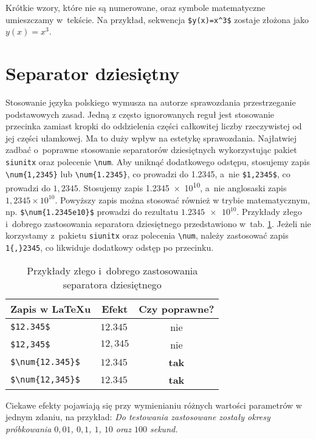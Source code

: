 Krótkie wzory, które nie są numerowane, oraz symbole matematyczne umieszczamy w~tekście. Na przykład, sekwencja \verb|$y(x)=x^3$| zostaje złożona jako $y(x)=x^3$.

\section{Separator dziesiętny}
Stosowanie języka polskiego wymusza na autorze sprawozdania przestrzeganie podstawowych zasad. Jedną z często ignorowanych reguł jest stosowanie przecinka zamiast kropki do oddzielenia części całkowitej liczby rzeczywistej od jej części ułamkowej. Ma to duży wpływ na estetykę sprawozdania. Najłatwiej zadbać o~poprawne stosowanie separatorów dziesiętnych wykorzystując pakiet \verb+siunitx+ oraz polecenie \verb+\num+. Aby uniknąć dodatkowego odstępu, stosujemy zapis \verb+\num{1,2345}+ lub \verb+\num{1.2345}+, co prowadzi do \num{1,2345}, a~nie \verb+$1,2345$+, co prowadzi do $1,2345$. Stosujemy zapis \num{1.2345e10}, a~nie anglosaski zapis $1{,}2345\times 10^{10}$. Powyższy zapis można stosować również w trybie matematycznym, np. \verb+$\num{1.2345e10}$+ prowadzi do rezultatu $\num{1.2345e10}$. Przykłady złego i~dobrego zastosowania separatora dziesiętnego przedstawiono w~tab. \ref{t_przecinki_kropki}. Jeżeli nie korzystamy z~pakietu \verb+siunitx+ oraz polecenia \verb+\num+, należy zastosować zapis \verb+1{,}2345+, co likwiduje dodatkowy odstęp po przecinku.

\begin{table}[H]
	\caption{Przykłady złego i~dobrego zastosowania separatora dziesiętnego}
	\label{t_przecinki_kropki}
\centering
\begin{tabular}{llc}
	\multicolumn{1}{c}{Zapis w \LaTeX u} & \multicolumn{1}{c}{Efekt} & \multicolumn{1}{c}{Czy poprawne?} \\ \hline
	\verb+$12.345$+ & $12.345$ & nie \\
	\verb+$12,345$+ & $12,345$ & nie \\
	\verb+$\num{12.345}$+ & $\num{12.345}$ & \textbf{tak} \\
	\verb+$\num{12,345}$+ & $\num{12,345}$ & \textbf{tak} \\
\end{tabular}
\end{table}

Ciekawe efekty pojawiają się przy wymienianiu różnych wartości parametrów w jednym zdaniu, na przykład: \emph{Do testowania zastosowane zostały okresy próbkowania $0,01$, $0,1$, $1$, $10$ oraz $100$ sekund.}

